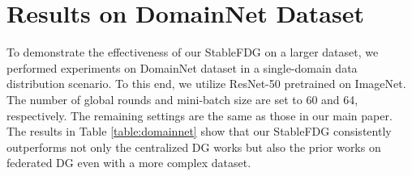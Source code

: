 \documentclass{article}
\theoremstyle{plain}
\theoremstyle{definition}
\theoremstyle{remark}
\begin{document}
 


%






\newpage

\appendix

\section{Results on DomainNet Dataset}
To demonstrate the effectiveness of our StableFDG on a larger dataset, we performed experiments on DomainNet dataset in a single-domain data distribution scenario. To this end, we utilize ResNet-50 pretrained on ImageNet. The number of global rounds and mini-batch size are set to 60 and 64, respectively. The remaining settings are the same as those in our main paper. The results in Table \ref{table:domainnet} show that our StableFDG consistently outperforms not only the centralized DG works but also the prior works on federated DG even with a more complex dataset.
\end{document}
